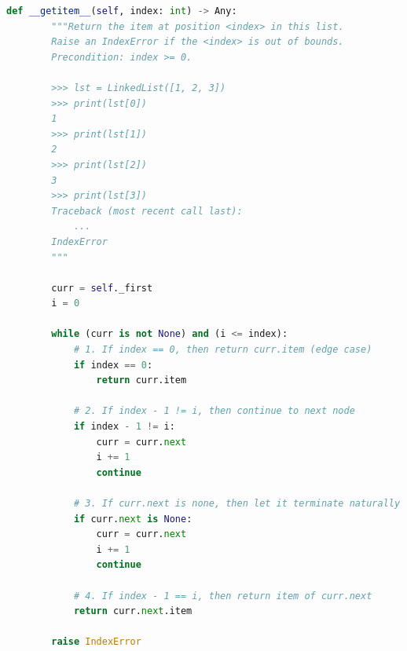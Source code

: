 \documentclass[12pt]{article}
\begin{document}
\bigskip

\begin{lstlisting}[language=Python,caption={worksheet\_13\_q2\_solution.py},captionpos=b]
    def __getitem__(self, index: int) -> Any:
        """Return the item at position <index> in this list.
        Raise an IndexError if the <index> is out of bounds.
        Precondition: index >= 0.

        >>> lst = LinkedList([1, 2, 3])
        >>> print(lst[0])
        1
        >>> print(lst[1])
        2
        >>> print(lst[2])
        3
        >>> print(lst[3])
        Traceback (most recent call last):
            ...
        IndexError
        """

        curr = self._first
        i = 0

        while (curr is not None) and (i <= index):
            # 1. If index == 0, then return curr.item (edge case)
            if index == 0:
                return curr.item

            # 2. If index - 1 != i, then continue to next node
            if index - 1 != i:
                curr = curr.next
                i += 1
                continue

            # 3. If curr.next is none, then let it terminate naturally
            if curr.next is None:
                curr = curr.next
                i += 1
                continue

            # 4. If index - 1 == i, then return item of curr.next
            return curr.next.item

        raise IndexError
\end{lstlisting}
\end{document}
